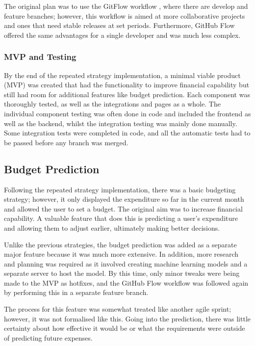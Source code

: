 The original plan was to use the GitFlow workflow \cite{GitFlow}, where there are develop and feature branches; however, this workflow is aimed at more collaborative projects and ones that need stable releases at set periods. Furthermore, GitHub Flow offered the same advantages for a single developer and was much less complex.

\subsubsection{MVP and Testing}
By the end of the repeated strategy implementation, a minimal viable product (MVP) was created that had the functionality to improve financial capability but still had room for additional features like budget prediction. Each component was thoroughly tested, as well as the integrations and pages as a whole. The individual component testing was often done in code and included the frontend as well as the backend, whilst the integration testing was mainly done manually. Some integration tests were completed in code, and all the automatic tests had to be passed before any branch was merged.

\subsection{Budget Prediction}
Following the repeated strategy implementation, there was a basic budgeting strategy; however, it only displayed the expenditure so far in the current month and allowed the user to set a budget. The original aim was to increase financial capability. A valuable feature that does this is predicting a user's expenditure and allowing them to adjust earlier, ultimately making better decisions.

Unlike the previous strategies, the budget prediction was added as a separate major feature because it was much more extensive. In addition, more research and planning was required as it involved creating machine learning models and a separate server to host the model. By this time, only minor tweaks were being made to the MVP as hotfixes, and the GitHub Flow workflow was followed again by performing this in a separate feature branch.

The process for this feature was somewhat treated like another agile sprint; however, it was not formalised like this. Going into the prediction, there was little certainty about how effective it would be or what the requirements were outside of predicting future expenses.

